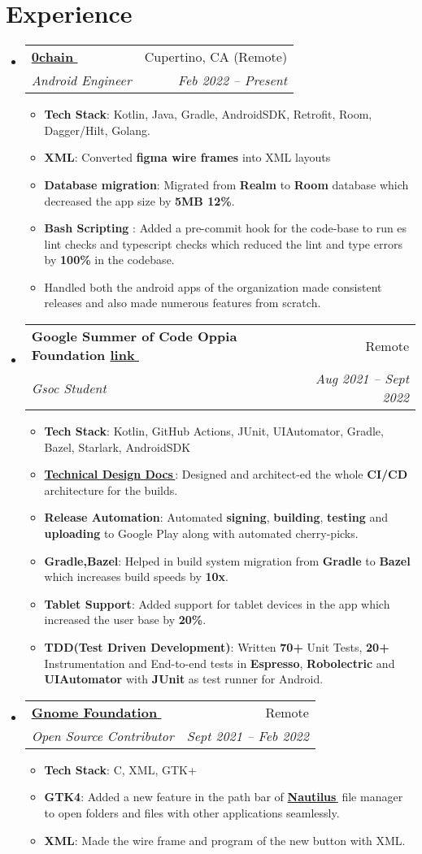 \documentclass[letterpaper,11pt]{article}
\makeatletter
\let\orighref\href
\renewcommand{\href}[2]{\orighref{#1}{#2\,\faExternalLink}}
\newcommand{\resumeItem}[2]{
  \item\small{
    \textbf{#1}{: #2 \vspace{-2pt}}
  }
}
\newcommand{\resumeSubheading}[4]{
  \vspace{-1pt}\item
    \begin{tabular*}{0.97\textwidth}{l@{\extracolsep{\fill}}r}
      \textbf{#1} & #2 \\
      \textit{\small#3} & \textit{\small #4} \\
    \end{tabular*}\vspace{-5pt}
}
\newcommand{\resumeSubHeadingListStart}{\begin{itemize}[leftmargin=*]}
\newcommand{\resumeSubHeadingListEnd}{\end{itemize}}
\newcommand{\resumeItemListStart}{\begin{itemize}}
\newcommand{\resumeItemListEnd}{\end{itemize}\vspace{-5pt}}
\makeatother
\begin{document}
\section{Experience}
\resumeSubHeadingListStart
\resumeSubheading
{\href{https://0chain.net}{0chain}}{Cupertino, CA (Remote)}
{Android Engineer}{Feb 2022 -- Present}
\resumeItemListStart
\resumeItem{Tech Stack}{Kotlin, Java, Gradle, AndroidSDK, Retrofit, Room, Dagger/Hilt, Golang.}
\resumeItem{XML}
{Converted \textbf{figma wire frames} into XML layouts}
\resumeItem{Database migration}
{Migrated from \textbf{Realm} to \textbf{Room} database which decreased the app size by \textbf{5MB 12\%}.}
\resumeItem{Bash Scripting  }
{Added a pre-commit hook for the code-base to run es lint checks and typescript checks which reduced the lint and type errors by \textbf{100\%} in the codebase.}
\item {Handled both the android apps of the organization made consistent releases and also made numerous features from scratch.}
\resumeItemListEnd
\resumeSubheading
{Google Summer of Code Oppia Foundation \href{https://docs.google.com/document/d/150Yk14Cxmy8OAbSSwgP1aXDBLo1b8HtuIhmrRhzEWU4/edit}{link}}{Remote}
{Gsoc Student}{Aug 2021 -- Sept 2022}
\resumeItemListStart
\resumeItem{Tech Stack}{Kotlin, GitHub Actions, JUnit, UIAutomator, Gradle, Bazel, Starlark, AndroidSDK}
\resumeItem{\href{https://docs.google.com/document/d/150Yk14Cxmy8OAbSSwgP1aXDBLo1b8HtuIhmrRhzEWU4/edit}{Technical Design Docs}}{Designed and architect-ed the whole \textbf{CI/CD} architecture for the builds. }
\resumeItem{Release Automation}{Automated \textbf{signing}, \textbf{building}, \textbf{testing} and \textbf{uploading} to Google Play along with automated cherry-picks.}
\resumeItem{Gradle,Bazel}
{Helped in build system migration from \textbf{Gradle} to \textbf{Bazel} which increases build speeds by \textbf{10x}.}
\resumeItem{Tablet Support}
{ Added support for tablet devices in the app which increased the user base by \textbf{20\%}. }
\resumeItem{TDD(Test Driven Development)}
{Written \textbf{70+} Unit Tests, \textbf{20+} Instrumentation and End-to-end tests in \textbf{Espresso}, \textbf{Robolectric} and \textbf{UIAutomator} with \textbf{JUnit} as test runner for Android.}
\resumeItemListEnd
\resumeSubheading
{\href{https://gnome.org}{Gnome Foundation}}{Remote}
{Open Source Contributor}{Sept 2021 -- Feb 2022}
\resumeItemListStart
\resumeItem{Tech Stack}{C, XML, GTK+}
\resumeItem{GTK4}
{Added a new feature in the path bar of \href{https://gitlab.gnome.org/GNOME/nautilus}{\textbf{Nautilus}} file manager to open folders and files with other applications seamlessly.}
\resumeItem{XML}
{Made the wire frame and program of the new button with XML.}
\resumeItemListEnd
\resumeSubHeadingListEnd
\end{document}
